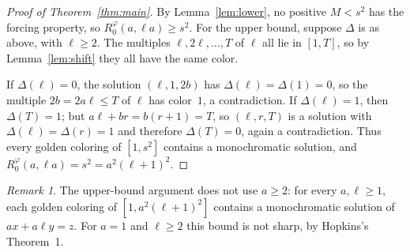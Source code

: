 \documentclass[11pt]{article}
\theoremstyle{remark}
\newtheorem{remark}[theorem]{Remark}
\newcommand{\Rg}{R_0^{\varphi}}
\begin{document}
\begin{proof}[Proof of Theorem~\ref{thm:main}]
By Lemma~\ref{lem:lower}, no positive $M<s^2$ has the forcing
property, so $\Rg(a,\ell a)\ge s^2$. For the upper bound, suppose
$\Delta$ is as above, with $\ell\ge2$. The multiples
$\ell,2\ell,\dots,T$ of $\ell$ all lie in $[1,T]$, so by
Lemma~\ref{lem:shift} they all have the same color.

If $\Delta(\ell)=0$, the solution $(\ell,1,2b)$ has
$\Delta(\ell)=\Delta(1)=0$, so the multiple $2b=2a\ell\le T$ of $\ell$
has color~$1$, a contradiction. If $\Delta(\ell)=1$, then $\Delta(T)=1$;
but $a\ell+br=b(r+1)=T$, so $(\ell,r,T)$ is a solution with
$\Delta(\ell)=\Delta(r)=1$ and therefore $\Delta(T)=0$, again a
contradiction. Thus every golden coloring of $[1,s^2]$ contains a
monochromatic solution, and $\Rg(a,\ell a)=s^2=a^2(\ell+1)^2$.
\end{proof}

\begin{remark}
The upper-bound argument does not use $a\ge2$: for every $a,\ell\ge1$,
each golden coloring of $[1,a^2(\ell+1)^2]$ contains a monochromatic
solution of $ax+a\ell y=z$. For $a=1$ and $\ell\ge2$ this bound is not
sharp, by Hopkins's Theorem~1.
\end{remark}
\end{document}
